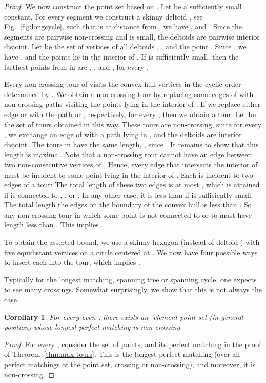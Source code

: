 \documentclass[11pt]{article}
\newtheorem{corollary}{Corollary}
\begin{document}
\begin{proof}
We now construct the point set  based on . Let  be a sufficiently small
constant. For every segment  we construct a skinny deltoid
, see Fig.~\ref{fig:longcycle},
such that  is at distance  from , we have
, and .
Since the segments  are pairwise non-crossing and  is small,
the deltoids  are pairwise interior disjoint.
Let  be the set of vertices of all deltoids , , and
the point . Since , we have
, and
the points  lie in the interior of .
If  is sufficiently small, then the farthest points from  in 
are , , and , for every .

Every non-crossing tour of  visits the convex hull vertices in the cyclic order
determined by . We obtain a non-crossing tour by replacing
some edges of  with non-crossing paths visiting the points
lying in the interior of . If we replace either edge  or
 with the path  or , respectively,
for every , then we obtain a tour. Let  be
the set of  tours obtained in this way. These tours are
non-crossing, since for every , we exchange an edge of
 with a path lying in , and the deltoids
 are interior disjoint. The tours in  have the
same length, ,
since . It remains to show that this length
is maximal. Note that a non-crossing tour cannot have an edge between two
non-consecutive vertices of . Hence, every edge that
intersects the interior of  must be incident to some point
 lying in the interior of . Each  is incident to two
edges of a tour: The total length of these two edges is at most ,
which is attained if  is connected to , , or .
In any other case, it is less than  if  is
sufficiently small. The total length the edges on the boundary of the
convex hull is less than . So any non-crossing tour in
which some point  is not connected to  or to 
must have length less than . This implies .

To obtain the asserted bound, we use a skinny hexagon (instead of deltoid )
with five equidistant vertices on a circle centered at .
We now have four possible ways to insert each  into the tour, which implies
.
\end{proof}

Typically for the longest matching, spanning tree or spanning
cycle, one expects to see many crossings. Somewhat surprisingly, we
show that this is not always the case.

\begin{corollary} \label{cor:noncrossing}
For every even , there exists an -element point set (in
general position) whose longest perfect matching is non-crossing.
\end{corollary}
\begin{proof}
For every , consider the set 
of  points, and its perfect matching 
in the proof of Theorem~\ref{thm:max-tours}. This is the longest perfect
matching (over all perfect matchings of the point set, crossing or non-crossing),
and moreover, it is non-crossing.
\end{proof}
\end{document}
